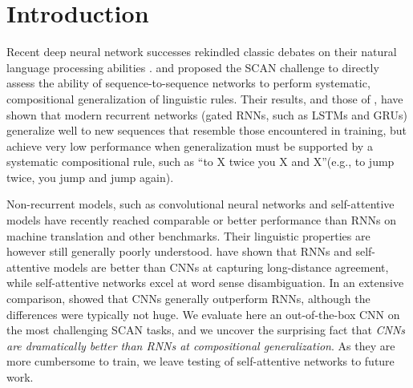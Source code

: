 \section{Introduction}
\label{sec:intro}

Recent deep neural network successes rekindled classic
debates on their natural language processing abilities
\cite[e.g.,][]{Kirov:Cotterell:2018,McCoy:etal:2018,Pater:2018}. \citet{Lake:Baroni:2017}
and \citet{Loula:etal:2018} proposed the SCAN challenge to
directly assess the ability of sequence-to-sequence networks to
perform systematic, compositional generalization of linguistic
rules. Their results, and those of \citet{Bastings:etal:2018}, have
shown that modern recurrent networks (gated RNNs, such as LSTMs and GRUs) generalize well
to new sequences that resemble those encountered in training,
but achieve very low performance when generalization must be
supported by a systematic compositional rule, such as ``to X twice 
you X and X''(e.g., to jump twice, you jump and jump again).


Non-recurrent models, such as convolutional neural networks
\cite[CNNs,][]{kalchbrenner:etal:2016, gehring:etal:2016,
  gehring:etal:2017} and self-attentive models
\cite{vaswani:etal:2017, chen:etal:2018} have recently reached
comparable or better performance than RNNs on machine translation and
other benchmarks. Their linguistic properties are however still
generally poorly understood.  have shown that
RNNs and self-attentive models are better than CNNs at capturing
long-distance agreement, while self-attentive networks excel at word
sense disambiguation. In an extensive comparison,
 showed that CNNs generally outperform RNNs,
although the differences were typically not huge. We evaluate here an out-of-the-box CNN on the most
challenging SCAN tasks, and we uncover the surprising fact that
\emph{CNNs are dramatically better than RNNs at compositional
  generalization}. As they are more cumbersome to train, we leave
testing of self-attentive networks to future work.

